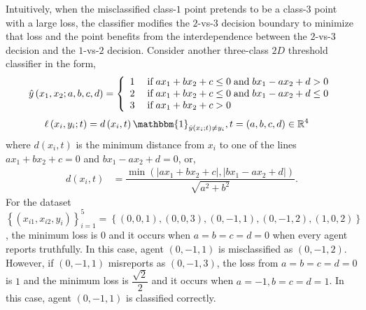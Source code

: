 \documentclass{article}
\begin{document}
\begin{figure}[H] \centering {} \label{fig:1dam}
\end{figure}
Intuitively, when the misclassified class-$1$ point pretends to be a class-$3$ point with a large loss, the classifier modifies the $2$-vs-$3$ decision boundary to minimize that loss and the point benefits from the interdependence between the $2$-vs-$3$ decision and the $1$-vs-$2$ decision.
\newline \newline
Consider another three-class $2D$ threshold classifier in the form,
\[ \hat{y}\left(x_{1}, x_{2}; a, b, c, d\right) =\left\{ \begin{array}{ll}
1& \text{\;if\;} a x_{1} + b x_{2} + c \leq  0 \text{\;and\;} b x_{1} - a x_{2} + d > 0 \\
2& \text{\;if\;} a x_{1} + b x_{2} + c \leq  0 \text{\;and\;} b x_{1} - a x_{2} + d \leq  0 \\
3& \text{\;if\;} a x_{1} + b x_{2} + c > 0 \\
\end{array}\right. \]
\begin{align*}
\ell\left(x_{i}, y_{i}; t\right) &= d\left(x_{i}, t\right) \mathbbm{1}_{\hat{y}\left(x_{i}; t\right) \neq  y_{i}}, t = \left(a, b, c, d\right) \in \mathbb{R}^{4}
\end{align*}
where $d\left(x_{i}, t \right) $ is the minimum distance from $x_{i}$ to one of the lines $a  x_{1} + b x_{2} + c = 0$ and $b  x_{1} - a x_{2} + d = 0$, or,
\begin{align*}
d\left(x_{i}, t \right)  &= \dfrac{\displaystyle\min\left(| a x_{1} + b x_{2} + c |, | b x_{1} - a x_{2} + d |\right)}{\sqrt{a^{2} + b^{2}}}.
\end{align*}
For the dataset $\left\{\left(x_{i1}, x_{i2}, y_{i}\right)\right\}_{i=1}^{5} = \left\{\left(0, 0, 1\right), \left(0, 0, 3\right), \left(0, -1, 1\right), \left(0, -1, 2\right), \left(1, 0, 2\right)\right\}$, the minimum loss is $0$ and it occurs when $a  = b  = c  = d  = 0$ when every agent reports truthfully. In this case, agent $\left(0, -1, 1\right)$ is misclassified as $\left(0, -1, 2\right)$. However, if $\left(0, -1, 1\right)$ misreports as $\left(0, -1, 3\right)$, the loss from $a  = b  = c  = d  = 0$ is $1$ and the minimum loss is $\dfrac{\sqrt{2}}{2}$ and it occurs when $a  = -1, b   = c  = d  = 1$. In this case, agent $\left(0, -1, 1\right)$ is classified correctly.
\newline \newline
\end{document}
